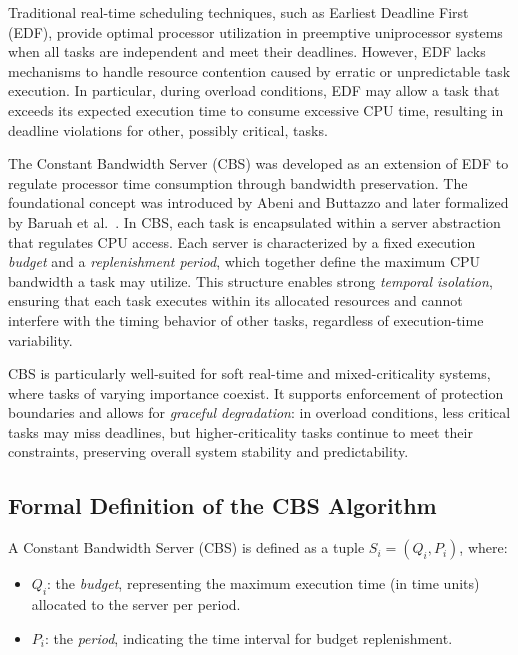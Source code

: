 \documentclass[conference]{IEEEtran}
\begin{document}
Traditional real-time scheduling techniques, such as Earliest Deadline First (EDF), provide optimal processor utilization in preemptive uniprocessor systems when all tasks are independent and meet their deadlines. However, EDF lacks mechanisms to handle resource contention caused by erratic or unpredictable task execution. In particular, during overload conditions, EDF may allow a task that exceeds its expected execution time to consume excessive CPU time, resulting in deadline violations for other, possibly critical, tasks.

The Constant Bandwidth Server (CBS) was developed as an extension of EDF to regulate processor time consumption through bandwidth preservation. The foundational concept was introduced by Abeni and Buttazzo and later formalized by Baruah et al.~\cite{baruah2004dynamic}. In CBS, each task is encapsulated within a server abstraction that regulates CPU access. Each server is characterized by a fixed execution \textit{budget} and a \textit{replenishment period}, which together define the maximum CPU bandwidth a task may utilize. This structure enables strong \textit{temporal isolation}, ensuring that each task executes within its allocated resources and cannot interfere with the timing behavior of other tasks, regardless of execution-time variability.

CBS is particularly well-suited for soft real-time and mixed-criticality systems, where tasks of varying importance coexist. It supports enforcement of protection boundaries and allows for \textit{graceful degradation}: in overload conditions, less critical tasks may miss deadlines, but higher-criticality tasks continue to meet their constraints, preserving overall system stability and predictability.

\subsection{Formal Definition of the CBS Algorithm}

A Constant Bandwidth Server (CBS) is defined as a tuple \( S_i = (Q_i, P_i) \), where:
\begin{itemize}
    \item \( Q_i \): the \textit{budget}, representing the maximum execution time (in time units) allocated to the server per period.
    \item \( P_i \): the \textit{period}, indicating the time interval for budget replenishment.
\end{itemize}
\end{document}
